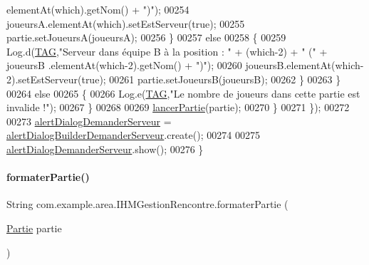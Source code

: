 \begin{DoxyCode}
      elementAt(which).getNom() + \textcolor{stringliteral}{")"});
00254                         joueursA.elementAt(which).setEstServeur(\textcolor{keyword}{true});
00255                         partie.setJoueursA(joueursA);
00256                     \}
00257                     \textcolor{keywordflow}{else}
00258                     \{
00259                         Log.d(\hyperlink{classcom_1_1example_1_1area_1_1_i_h_m_gestion_rencontre_a0ac4d9152d48619cd697c8c69166219f}{TAG},\textcolor{stringliteral}{"Serveur dans équipe B à la position : "} + (which-2) + \textcolor{stringliteral}{" ("} + joueursB
      .elementAt(which-2).getNom() + \textcolor{stringliteral}{")"});
00260                         joueursB.elementAt(which-2).setEstServeur(\textcolor{keyword}{true});
00261                         partie.setJoueursB(joueursB);
00262                     \}
00263                 \}
00264                 \textcolor{keywordflow}{else}
00265                 \{
00266                     Log.e(\hyperlink{classcom_1_1example_1_1area_1_1_i_h_m_gestion_rencontre_a0ac4d9152d48619cd697c8c69166219f}{TAG},\textcolor{stringliteral}{"Le nombre de joueurs dans cette partie est invalide !"});
00267                 \}
00268 
00269                 \hyperlink{classcom_1_1example_1_1area_1_1_i_h_m_gestion_rencontre_a284518fddedfaed4b257f852290e1e63}{lancerPartie}(partie);
00270             \}
00271         \});
00272 
00273         \hyperlink{classcom_1_1example_1_1area_1_1_i_h_m_gestion_rencontre_a9e68d97c4b50758ce1d6a2d8a217d5fc}{alertDialogDemanderServeur} = 
      \hyperlink{classcom_1_1example_1_1area_1_1_i_h_m_gestion_rencontre_a47ed7018b2af1ac9197715b9008a34a5}{alertDialogBuilderDemanderServeur}.create();
00274 
00275         \hyperlink{classcom_1_1example_1_1area_1_1_i_h_m_gestion_rencontre_a9e68d97c4b50758ce1d6a2d8a217d5fc}{alertDialogDemanderServeur}.show();
00276     \}
\end{DoxyCode}
\mbox{\label{classcom_1_1example_1_1area_1_1_i_h_m_gestion_rencontre_aadc556a63bb77b707f4677c34d61dae5}} 
\paragraph{\texorpdfstring{formater\+Partie()}{formaterPartie()}}
{\footnotesize\ttfamily String com.\+example.\+area.\+I\+H\+M\+Gestion\+Rencontre.\+formater\+Partie (\begin{DoxyParamCaption}\item[{\hyperlink{classcom_1_1example_1_1area_1_1_partie}{Partie}}]{partie }\end{DoxyParamCaption})\hspace{0.3cm}{\ttfamily [private]}}



